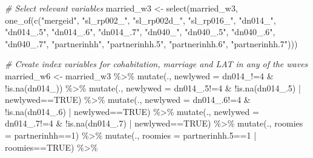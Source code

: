 \documentclass[
]{article}
\newenvironment{Shaded}{\begin{snugshade}}{\end{snugshade}}
\newcommand{\AttributeTok}[1]{\textcolor[rgb]{0.77,0.63,0.00}{#1}}
\newcommand{\CommentTok}[1]{\textcolor[rgb]{0.56,0.35,0.01}{\textit{#1}}}
\newcommand{\ConstantTok}[1]{\textcolor[rgb]{0.00,0.00,0.00}{#1}}
\newcommand{\DecValTok}[1]{\textcolor[rgb]{0.00,0.00,0.81}{#1}}
\newcommand{\FloatTok}[1]{\textcolor[rgb]{0.00,0.00,0.81}{#1}}
\newcommand{\FunctionTok}[1]{\textcolor[rgb]{0.00,0.00,0.00}{#1}}
\newcommand{\NormalTok}[1]{#1}
\newcommand{\OtherTok}[1]{\textcolor[rgb]{0.56,0.35,0.01}{#1}}
\newcommand{\SpecialCharTok}[1]{\textcolor[rgb]{0.00,0.00,0.00}{#1}}
\newcommand{\StringTok}[1]{\textcolor[rgb]{0.31,0.60,0.02}{#1}}
\begin{document}
\begin{Shaded}
\begin{Highlighting}[]
\CommentTok{\# Select relevant variables}
\NormalTok{married\_w3 }\OtherTok{\textless{}{-}} \FunctionTok{select}\NormalTok{(married\_w3, }\FunctionTok{one\_of}\NormalTok{(}\FunctionTok{c}\NormalTok{(}\StringTok{"mergeid"}\NormalTok{, }\StringTok{"sl\_rp002\_"}\NormalTok{, }\StringTok{"sl\_rp002d\_"}\NormalTok{,  }\StringTok{"sl\_rp016\_"}\NormalTok{, }\StringTok{"dn014\_"}\NormalTok{, }\StringTok{"dn014\_.5"}\NormalTok{, }\StringTok{"dn014\_.6"}\NormalTok{, }\StringTok{"dn014\_.7"}\NormalTok{, }\StringTok{"dn040\_"}\NormalTok{, }\StringTok{"dn040\_.5"}\NormalTok{, }\StringTok{"dn040\_.6"}\NormalTok{, }\StringTok{"dn040\_.7"}\NormalTok{, }\StringTok{"partnerinhh"}\NormalTok{, }\StringTok{"partnerinhh.5"}\NormalTok{, }\StringTok{"partnerinhh.6"}\NormalTok{, }\StringTok{"partnerinhh.7"}\NormalTok{)))}

\CommentTok{\# Create index variables for cohabitation, marriage and LAT in any of the waves}
\NormalTok{married\_w6 }\OtherTok{\textless{}{-}}\NormalTok{ married\_w3 }\SpecialCharTok{\%\textgreater{}\%}
  \FunctionTok{mutate}\NormalTok{(., }\AttributeTok{newlywed =}\NormalTok{ dn014\_}\SpecialCharTok{!=}\DecValTok{4} \SpecialCharTok{\&} \SpecialCharTok{!}\FunctionTok{is.na}\NormalTok{(dn014\_)) }\SpecialCharTok{\%\textgreater{}\%}
  \FunctionTok{mutate}\NormalTok{(., }\AttributeTok{newlywed =}\NormalTok{ dn014\_}\FloatTok{.5}\SpecialCharTok{!=}\DecValTok{4} \SpecialCharTok{\&} \SpecialCharTok{!}\FunctionTok{is.na}\NormalTok{(dn014\_}\FloatTok{.5}\NormalTok{) }\SpecialCharTok{|}\NormalTok{ newlywed}\SpecialCharTok{==}\ConstantTok{TRUE}\NormalTok{) }\SpecialCharTok{\%\textgreater{}\%}
  \FunctionTok{mutate}\NormalTok{(., }\AttributeTok{newlywed =}\NormalTok{ dn014\_}\FloatTok{.6}\SpecialCharTok{!=}\DecValTok{4} \SpecialCharTok{\&} \SpecialCharTok{!}\FunctionTok{is.na}\NormalTok{(dn014\_}\FloatTok{.6}\NormalTok{) }\SpecialCharTok{|}\NormalTok{ newlywed}\SpecialCharTok{==}\ConstantTok{TRUE}\NormalTok{) }\SpecialCharTok{\%\textgreater{}\%}
  \FunctionTok{mutate}\NormalTok{(., }\AttributeTok{newlywed =}\NormalTok{ dn014\_}\FloatTok{.7}\SpecialCharTok{!=}\DecValTok{4} \SpecialCharTok{\&} \SpecialCharTok{!}\FunctionTok{is.na}\NormalTok{(dn014\_}\FloatTok{.7}\NormalTok{) }\SpecialCharTok{|}\NormalTok{ newlywed}\SpecialCharTok{==}\ConstantTok{TRUE}\NormalTok{) }\SpecialCharTok{\%\textgreater{}\%}
  \FunctionTok{mutate}\NormalTok{(., }\AttributeTok{roomies =}\NormalTok{ partnerinhh}\SpecialCharTok{==}\DecValTok{1}\NormalTok{) }\SpecialCharTok{\%\textgreater{}\%}
  \FunctionTok{mutate}\NormalTok{(., }\AttributeTok{roomies =}\NormalTok{ partnerinhh}\FloatTok{.5}\SpecialCharTok{==}\DecValTok{1} \SpecialCharTok{|}\NormalTok{ roomies}\SpecialCharTok{==}\ConstantTok{TRUE}\NormalTok{) }\SpecialCharTok{\%\textgreater{}\%}

\end{Highlighting}
\end{Shaded}
\end{document}
